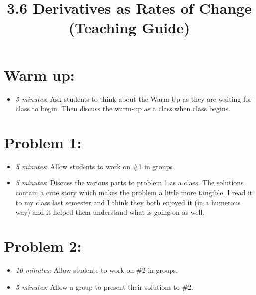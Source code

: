\documentclass[handout,nooutcomes]{ximera}
\title{3.6 Derivatives as Rates of Change (Teaching Guide)}
\begin{document}
\begin{abstract}		\end{abstract}
\maketitle


\section*{Warm up:} 
	
	\begin{itemize}
	
	\item  \emph{5 minutes}:  Ask students to think about the Warm-Up as they are waiting for class to begin.  Then discuss the warm-up as a class when class begins.
	
	
	
	\end{itemize}


\section*{Problem 1:}

	\begin{itemize}
	
	\item  \emph{5 minutes}:  Allow students to work on \#1 in groups.  
		
	\item  \emph{5 minutes}:  Discuss the various parts to problem 1 as a class.  The solutions contain a cute story which makes the problem a little more tangible.  I read it to my class last semester and I think they both enjoyed it (in a humerous way) and it helped them understand what is going on as well.	
	\end{itemize}	



\section*{Problem 2:}

	\begin{itemize}
	
	\item  \emph{10 minutes}:  Allow students to work on \#2 in groups.  
	
	\item  \emph{5 minutes}:  Allow a group to present their solutions to \#2.
	
	\end{itemize}
	
	
	

	
	
	

	
	

	
	
	

	
	
	
\end{document}
